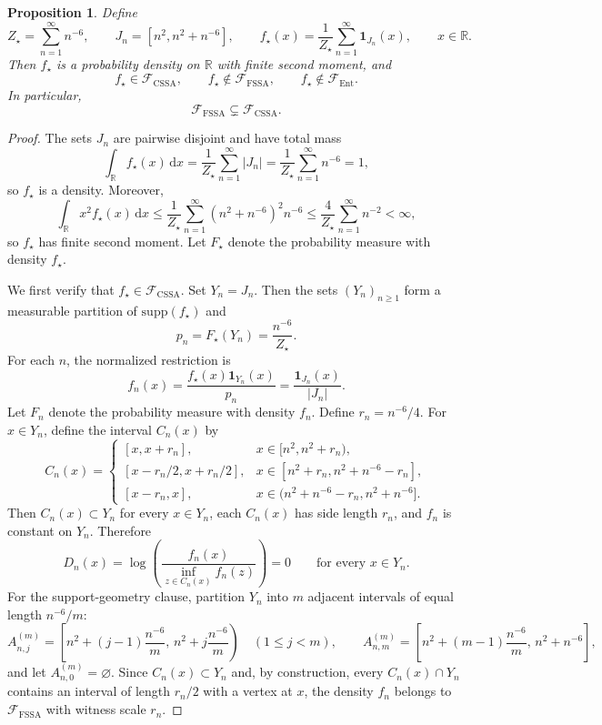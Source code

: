 \documentclass[11pt]{article}
\newtheorem{proposition}[theorem]{Proposition}
\theoremstyle{definition}
\begin{document}
\begin{proposition}
\label{prop:Scnt-strict}
Define
\[
Z_\star=\sum_{n=1}^\infty n^{-6},
\qquad
J_n=[n^2,n^2+n^{-6}],
\qquad
f_\star(x)=\frac{1}{Z_\star}\sum_{n=1}^\infty \mathbf{1}_{J_n}(x),
\qquad x\in\mathbb{R}.
\]
Then $f_\star$ is a probability density on $\mathbb{R}$ with finite second moment, and
\[
f_\star\in\mathcal F_{\mathrm{CSSA}},
\qquad
f_\star\notin\mathcal F_{\mathrm{FSSA}},
\qquad
f_\star\notin\mathcal F_{\mathrm{Ent}}.
\]
In particular,
\[
\mathcal F_{\mathrm{FSSA}}\subsetneq \mathcal F_{\mathrm{CSSA}}.
\]
\end{proposition}

\begin{proof}
The sets $J_n$ are pairwise disjoint and have total mass
\[
\int_{\mathbb{R}} f_\star(x)\,\mathrm{d}x
=\frac{1}{Z_\star}\sum_{n=1}^\infty |J_n|
=\frac{1}{Z_\star}\sum_{n=1}^\infty n^{-6}=1,
\]
so $f_\star$ is a density. Moreover,
\[
\int_{\mathbb{R}} x^2 f_\star(x)\,\mathrm{d}x
\le \frac{1}{Z_\star}\sum_{n=1}^\infty (n^2+n^{-6})^2 n^{-6}
\le \frac{4}{Z_\star}\sum_{n=1}^\infty n^{-2}<\infty,
\]
so $f_\star$ has finite second moment. Let $F_\star$ denote the probability measure with density $f_\star$.

We first verify that $f_\star\in \mathcal F_{\mathrm{CSSA}}$. Set $Y_n=J_n$. Then the sets $(Y_n)_{n\ge1}$ form a measurable partition of $\mathrm{supp}(f_\star)$ and
\[
p_n=F_\star(Y_n)=\frac{n^{-6}}{Z_\star}.
\]
For each $n$, the normalized restriction is
\[
f_n(x)=\frac{f_\star(x)\mathbf{1}_{Y_n}(x)}{p_n}
=\frac{\mathbf{1}_{J_n}(x)}{|J_n|}.
\]
Let $F_n$ denote the probability measure with density $f_n$. Define $r_n=n^{-6}/4$. For $x\in Y_n$, define the interval $C_n(x)$ by
\[
C_n(x)=
\begin{cases}
[x,x+r_n], & x\in [n^2,n^2+r_n),\\[4pt]
[x-r_n/2,x+r_n/2], & x\in [n^2+r_n,n^2+n^{-6}-r_n],\\[4pt]
[x-r_n,x], & x\in (n^2+n^{-6}-r_n,n^2+n^{-6}].
\end{cases}
\]
Then $C_n(x)\subset Y_n$ for every $x\in Y_n$, each $C_n(x)$ has side length $r_n$, and $f_n$ is constant on $Y_n$. Therefore
\[
D_n(x)=\log\!\left(\frac{f_n(x)}{\inf_{z\in C_n(x)}f_n(z)}\right)=0
\qquad\text{for every }x\in Y_n.
\]
For the support-geometry clause, partition $Y_n$ into $m$ adjacent intervals of equal length $n^{-6}/m$:
\[
A^{(m)}_{n,j}=\left[n^2+(j-1)\frac{n^{-6}}{m},\,n^2+j\frac{n^{-6}}{m}\right)
\quad (1\le j<m),
\qquad
A^{(m)}_{n,m}=\left[n^2+(m-1)\frac{n^{-6}}{m},\,n^2+n^{-6}\right],
\]
and let $A^{(m)}_{n,0}=\varnothing$. Since $C_n(x)\subset Y_n$ and, by construction, every $C_n(x)\cap Y_n$ contains an interval of length $r_n/2$ with a vertex at $x$, the density $f_n$ belongs to $\mathcal F_{\mathrm{FSSA}}$ with witness scale $r_n$.


\end{proof}
\end{document}
